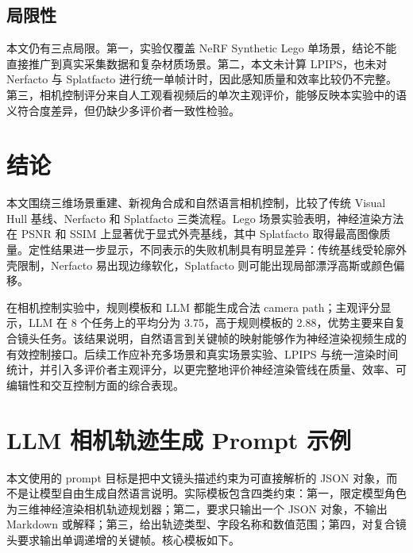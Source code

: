\documentclass[a4paper, 12pt, centering]{article}
\begin{document}
\subsection{局限性}
本文仍有三点局限。第一，实验仅覆盖 NeRF Synthetic Lego 单场景，结论不能直接推广到真实采集数据和复杂材质场景。第二，本文未计算 LPIPS，也未对 Nerfacto 与 Splatfacto 进行统一单帧计时，因此感知质量和效率比较仍不完整。第三，相机控制评分来自人工观看视频后的单次主观评价，能够反映本实验中的语义符合度差异，但仍缺少多评价者一致性检验。

\section{结论}
本文围绕三维场景重建、新视角合成和自然语言相机控制，比较了传统 Visual Hull 基线、Nerfacto 和 Splatfacto 三类流程。Lego 场景实验表明，神经渲染方法在 PSNR 和 SSIM 上显著优于显式外壳基线，其中 Splatfacto 取得最高图像质量。定性结果进一步显示，不同表示的失败机制具有明显差异：传统基线受轮廓外壳限制，Nerfacto 易出现边缘软化，Splatfacto 则可能出现局部漂浮高斯或颜色偏移。

在相机控制实验中，规则模板和 LLM 都能生成合法 camera path；主观评分显示，LLM 在 8 个任务上的平均分为 3.75，高于规则模板的 2.88，优势主要来自复合镜头任务。该结果说明，自然语言到关键帧的映射能够作为神经渲染视频生成的有效控制接口。后续工作应补充多场景和真实场景实验、LPIPS 与统一渲染时间统计，并引入多评价者主观评分，以更完整地评价神经渲染管线在质量、效率、可编辑性和交互控制方面的综合表现。

\appendix
\section{LLM 相机轨迹生成 Prompt 示例}
本文使用的 prompt 目标是把中文镜头描述约束为可直接解析的 JSON 对象，而不是让模型自由生成自然语言说明。实际模板包含四类约束：第一，限定模型角色为三维神经渲染相机轨迹规划器；第二，要求只输出一个 JSON 对象，不输出 Markdown 或解释；第三，给出轨迹类型、字段名称和数值范围；第四，对复合镜头要求输出单调递增的关键帧。核心模板如下。
\end{document}
